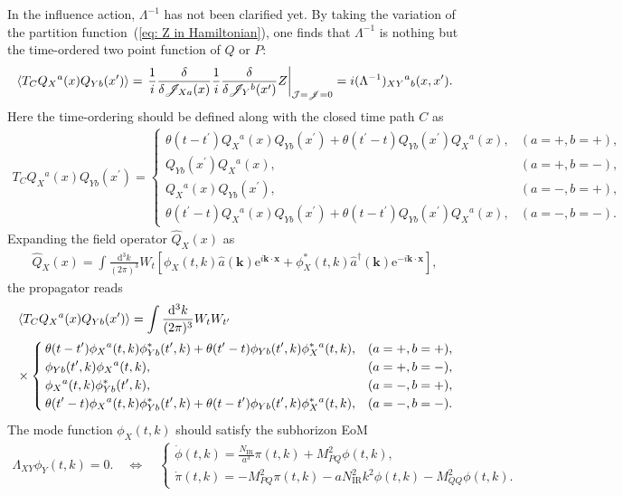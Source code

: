 \documentclass[aps, prd
, preprint
, nofootinbib 
]{revtex4-1}
\newcommand{\var}[2]{\frac{\delta #1}{\delta #2}}
\newcommand{\dd}{\mathrm{d}}
\newcommand{\ee}{\mathrm{e}}
\newcommand{\IR}{\text{IR}}
\newcommand{\dk}{\frac{\dd^3k}{(2\pi)^3}}
\newcommand{\dps}{\displaystyle}
\newcommand{\calJ}{\mathcal{J}}
\newcommand{\scrJ}{\mathscr{J}}
\newcommand{\bae}[1]{\begin{align} #1 \end{align}}
\newcommand{\bce}[1]{\begin{cases} #1 \end{cases}}
\begin{document}
In the influence action, $\Lambda^{-1}$ has not been clarified yet.
By taking the variation of the partition function~(\ref{eq: Z in Hamiltonian}), one finds that $\Lambda^{-1}$ is nothing but the time-ordered two
point function of $Q$ or $P$:
\bae{
	\braket{T_CQ_X{}^a(x)Q_{Yb}(x^\prime)}=\left.\frac{1}{i}\var{}{\scrJ_{Xa}(x)}\frac{1}{i}\var{}{\scrJ_Y{}^b(x^\prime)}Z\right|_{\calJ=\scrJ=0}
	=i(\Lambda^{-1})_{XY}{}^a{}_b(x,x^\prime).
}
Here the time-ordering should be defined along with the closed time path $C$ as
\bae{
	T_CQ_X{}^a(x)Q_{Yb}(x^\prime)=
	\bce{
		\dps
		\theta(t-t^\prime)Q_X{}^a(x)Q_{Yb}(x^\prime)+\theta(t^\prime-t)Q_{Yb}(x^\prime)Q_X{}^a(x), & 
		\dps
		(a=+,b=+), \\
		\dps
		Q_{Yb}(x^\prime)Q_X{}^a(x), & 
		\dps
		(a=+,b=-), \\
		\dps
		Q_X{}^a(x)Q_{Yb}(x^\prime), &
		\dps
		(a=-,b=+), \\
		\dps
		\theta(t^\prime-t)Q_X{}^a(x)Q_{Yb}(x^\prime)+\theta(t-t^\prime)Q_{Yb}(x^\prime)Q_X{}^a(x), & 
		\dps
		(a=-,b=-).
	}
}
Expanding the field operator $\hat{Q}_X(x)$ as 
\bae{
	\hat{Q}_X(x)=\int\dk W_t\left[\phi_X(t,k)\hat{a}(\mathbf{k})\ee^{i\mathbf{k}\cdot\mathbf{x}}
	+\phi_X^*(t,k)\hat{a}^\dagger(\mathbf{k})\ee^{-i\mathbf{k}\cdot\mathbf{x}}\right],
}
the propagator reads
\bae{
	&\braket{T_CQ_X{}^a(x)Q_{Yb}(x^\prime)}=\int\dk W_tW_{t^\prime} \nonumber \\
	&\times\bce{
		\dps
		\theta(t-t^\prime)\phi_X{}^a(t,k)\phi^*_{Yb}(t^\prime,k)+\theta(t^\prime-t)\phi_{Yb}(t^\prime,k)\phi^*_X{}^a(t,k), & 
		\dps
		(a=+,b=+), \\
		\dps
		\phi_{Yb}(t^\prime,k)\phi_X{}^a(t,k), & 
		\dps
		(a=+,b=-), \\
		\dps
		\phi_X{}^a(t,k)\phi^*_{Yb}(t^\prime,k), &
		\dps
		(a=-,b=+), \\
		\dps
		\theta(t^\prime-t)\phi_X{}^a(t,k)\phi^*_{Yb}(t^\prime,k)+\theta(t-t^\prime)\phi_{Yb}(t^\prime,k)\phi^*_X{}^a(t,k), & 
		\dps
		(a=-,b=-).
	}
}
The mode function $\phi_X(t,k)$ should satisfy the subhorizon EoM
\bae{
	\Lambda_{XY}\phi_Y(t,k)=0. \quad \Leftrightarrow \quad
	\bce{
		\dps
		\dot{\phi}(t,k)=\frac{N_\IR}{a^3}\pi(t,k)+M_{PQ}^2\phi(t,k), \\[10pt]
		\dps
		\dot{\pi}(t,k)=-M_{PQ}^2\pi(t,k)-aN_\IR^2k^2\phi(t,k)-M_{QQ}^2\phi(t,k).
	}
}
\end{document}
